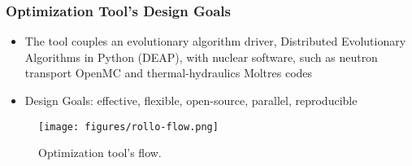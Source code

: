\begin{frame}
    \frametitle{Optimization Tool's Design Goals}
    \begin{minipage}[c]{0.45\textwidth}
    \begin{itemize}
        \item The tool couples an evolutionary algorithm driver, Distributed 
        Evolutionary Algorithms in Python (DEAP), with 
        nuclear software, such as neutron transport OpenMC and thermal-hydraulics 
        Moltres codes
        \item Design Goals: effective, flexible, open-source, parallel,
        reproducible
    \end{itemize}
    \end{minipage}\hfill
    \begin{minipage}[c]{0.55\textwidth}
        \centering
        \begin{figure}
            \texttt{[image: figures/rollo-flow.png]} 
            \caption{Optimization tool's flow.}
        \end{figure}
    \end{minipage}
\end{frame}